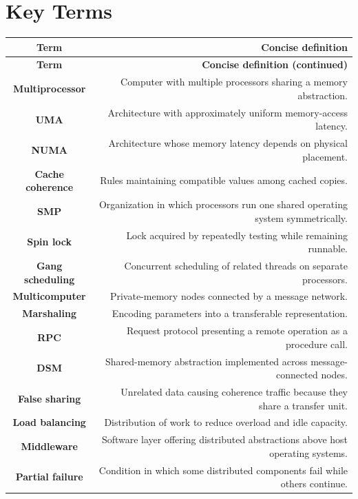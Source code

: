 \documentclass[10pt,letterpaper]{article}
\begin{document}
\section*{Key Terms}
\small
\begin{longtable}{C N}
\color{white}\textbf{Term} & \color{white}\textbf{Concise definition}\\
\endfirsthead
{}\color{white}\textbf{Term} & \color{white}\textbf{Concise definition (continued)}\\
\endhead
\textbf{Multiprocessor} & Computer with multiple processors sharing a memory abstraction.\\\hline
\textbf{UMA} & Architecture with approximately uniform memory-access latency.\\\hline
\textbf{NUMA} & Architecture whose memory latency depends on physical placement.\\\hline
\textbf{Cache coherence} & Rules maintaining compatible values among cached copies.\\\hline
\textbf{SMP} & Organization in which processors run one shared operating system symmetrically.\\\hline
\textbf{Spin lock} & Lock acquired by repeatedly testing while remaining runnable.\\\hline
\textbf{Gang scheduling} & Concurrent scheduling of related threads on separate processors.\\\hline
\textbf{Multicomputer} & Private-memory nodes connected by a message network.\\\hline
\textbf{Marshaling} & Encoding parameters into a transferable representation.\\\hline
\textbf{RPC} & Request protocol presenting a remote operation as a procedure call.\\\hline
\textbf{DSM} & Shared-memory abstraction implemented across message-connected nodes.\\\hline
\textbf{False sharing} & Unrelated data causing coherence traffic because they share a transfer unit.\\\hline
\textbf{Load balancing} & Distribution of work to reduce overload and idle capacity.\\\hline
\textbf{Middleware} & Software layer offering distributed abstractions above host operating systems.\\\hline
\textbf{Partial failure} & Condition in which some distributed components fail while others continue.\\\hline
\end{longtable}
\normalsize
\end{document}

